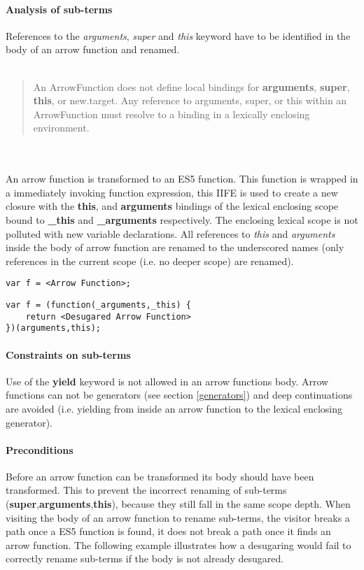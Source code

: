 \paragraph{Analysis of sub-terms}
References to the \textit{arguments}, \textit{super} and \textit{this} keyword have to be identified in the body of an arrow function and renamed.
\\
\\
\blockquote[{\cite[14.2.16]{SpecJS}}]{An ArrowFunction does not define local bindings for \textbf{arguments}, \textbf{super}, \textbf{this}, or new.target. Any reference to arguments, super, or this within an ArrowFunction must resolve to a binding in a lexically enclosing environment.}
\\\\
An arrow function is transformed to an ES5 function. This function is wrapped in a immediately invoking function expression, this IIFE is used to create a new closure with the \textbf{this}, and \textbf{arguments} bindings of the lexical enclosing scope bound to \textbf{\_this} and \textbf{\_arguments} respectively. The enclosing lexical scope is not polluted with new variable declarations. All references to \textit{this} and \textit{arguments} inside the body of arrow function are renamed to the underscored names (only references in the current scope (i.e. no deeper scope) are renamed).

\begin{lstlisting}
var f = <Arrow Function>;
\end{lstlisting}

\begin{lstlisting}
var f = (function(_arguments,_this) {
	return <Desugared Arrow Function>
})(arguments,this);
\end{lstlisting}

\paragraph{Constraints on sub-terms}
Use of the \textbf{yield} keyword is not allowed in an arrow functions body. Arrow functions can not be generators (see section \ref{generators}) and deep continuations are avoided (i.e. yielding from inside an arrow function to the lexical enclosing generator).

\paragraph{Preconditions}
Before an arrow function can be transformed its body should have been transformed. This to prevent the incorrect renaming of sub-terms (\textbf{super},\textbf{arguments},\textbf{this}), because they still fall in the same scope depth. When visiting the body of an arrow function to rename sub-terms, the visitor breaks a path once a ES5 function is found, it does not break a path once it finds an arrow function. The following example illustrates how a desugaring would fail to correctly rename sub-terms if the body is not already desugared.

